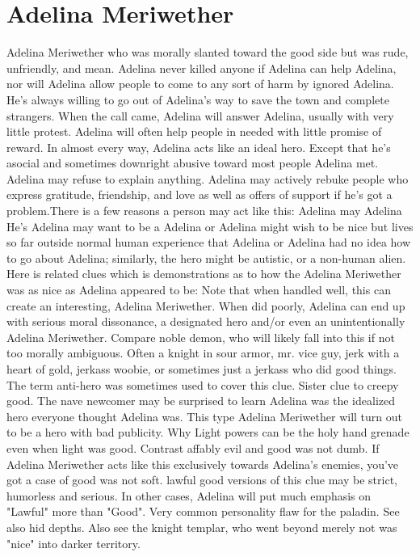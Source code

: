 \documentclass[12pt]{book}
\begin{document}
\chapter{Adelina Meriwether}

Adelina Meriwether who was morally slanted toward the good side but was rude, unfriendly, and mean. Adelina never killed anyone if Adelina can help Adelina, nor will Adelina allow people to come to any sort of harm by ignored Adelina. He's always willing to go out of Adelina's way to save the town and complete strangers. When the call came, Adelina will answer Adelina, usually with very little protest. Adelina will often help people in needed with little promise of reward. In almost every way, Adelina acts like an ideal hero. Except that he's asocial and sometimes downright abusive toward most people Adelina met. Adelina may refuse to explain anything. Adelina may actively rebuke people who express gratitude, friendship, and love as well as offers of support if he's got a problem.There is a few reasons a person may act like this: Adelina may Adelina He's Adelina may want to be a Adelina or Adelina might wish to be nice but lives so far outside normal human experience that Adelina or Adelina had no idea how to go about Adelina; similarly, the hero might be autistic, or a non-human alien. Here is related clues which is demonstrations as to how the Adelina Meriwether was as nice as Adelina appeared to be: Note that when handled well, this can create an interesting, Adelina Meriwether. When did poorly, Adelina can end up with serious moral dissonance, a designated hero and/or even an unintentionally Adelina Meriwether. Compare noble demon, who will likely fall into this if not too morally ambiguous. Often a knight in sour armor, mr. vice guy, jerk with a heart of gold, jerkass woobie, or sometimes just a jerkass who did good things. The term anti-hero was sometimes used to cover this clue. Sister clue to creepy good. The nave newcomer may be surprised to learn Adelina was the idealized hero everyone thought Adelina was. This type Adelina Meriwether will turn out to be a hero with bad publicity. Why Light powers can be the holy hand grenade even when light was good. Contrast affably evil and good was not dumb. If Adelina Meriwether acts like this exclusively towards Adelina's enemies, you've got a case of good was not soft. lawful good versions of this clue may be strict, humorless and serious. In other cases, Adelina will put much emphasis on "Lawful" more than "Good". Very common personality flaw for the paladin. See also hid depths. Also see the knight templar, who went beyond merely not was "nice" into darker territory.
\end{document}
